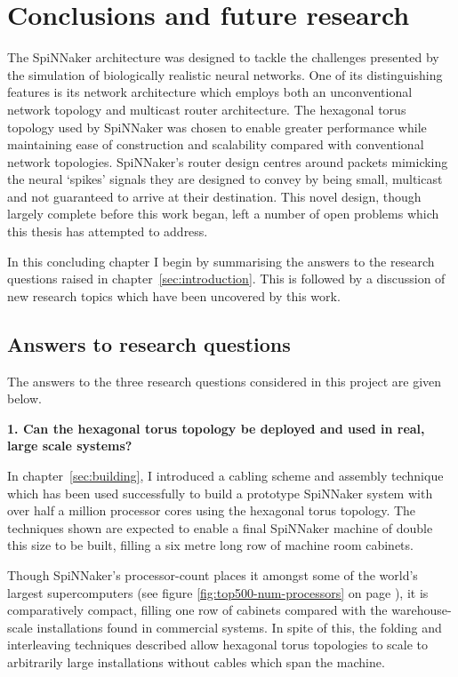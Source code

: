 \chapter{Conclusions and future research}
	
	The SpiNNaker architecture was designed to tackle the challenges presented by
	the simulation of biologically realistic neural networks. One of its
	distinguishing features is its network architecture which employs both an
	unconventional network topology and multicast router architecture. The
	hexagonal torus topology used by SpiNNaker was chosen to enable greater
	performance while maintaining ease of construction and scalability compared
	with conventional network topologies. SpiNNaker's router design centres
	around packets mimicking the neural `spikes' signals they are designed to
	convey by being small, multicast and not guaranteed to arrive at their
	destination.  This novel design, though largely complete before this work
	began, left a number of open problems which this thesis has attempted to
	address.
	
	In this concluding chapter I begin by summarising the answers to the research
	questions raised in chapter~\ref{sec:introduction}. This is followed by a
	discussion of new research topics which have been uncovered by this work.
	
	\section{Answers to research questions}
		
		The answers to the three research questions considered in this project are
		given below.
		
		\textbf{1. Can the hexagonal torus topology be deployed and used in real,
		large scale systems?}
		
		In chapter~\ref{sec:building}, I introduced a cabling scheme and assembly
		technique which has been used successfully to build a prototype SpiNNaker
		system with over half a million processor cores using the hexagonal torus
		topology. The techniques shown are expected to enable a final SpiNNaker
		machine of double this size to be built, filling a six metre long row of
		machine room cabinets.
		
		Though SpiNNaker's processor-count places it amongst some of the world's
		largest supercomputers (see figure \ref{fig:top500-num-processors} on page
		\pageref{fig:top500-num-processors}), it is comparatively compact, filling
		one row of cabinets compared with the warehouse-scale installations found
		in commercial systems. In spite of this, the folding and interleaving
		techniques described allow hexagonal torus topologies to scale to
		arbitrarily large installations without cables which span the machine.
		
